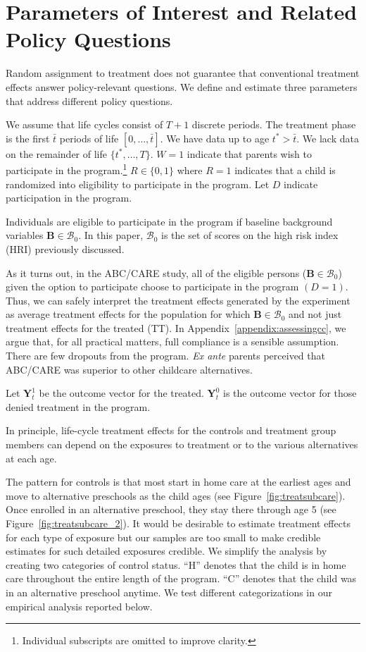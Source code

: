 \section{Parameters of Interest and Related Policy Questions} \label{section:methodsquestions}

Random assignment to treatment does not guarantee that conventional treatment effects answer policy-relevant questions. We define and estimate three parameters that address different policy questions.

We assume that life cycles consist of $T+1$ discrete periods. The treatment phase is the first $\bar{t}$ periods of life $\left[0,\dots,\bar{t}\right]$. We have data up to age $t^{*}>\bar{t}$. We lack data on the remainder of life $\{t^*,\dots,T\}$. $W=1$ indicate that parents wish to participate in the program.\footnote{Individual subscripts are omitted to improve clarity.} $R \in \{0,1\}$ where $R=1$ indicates that a child is randomized into eligibility to participate in the program. Let $D$ indicate participation in the program.

Individuals are eligible to participate in the program if baseline background variables $\bm{B}\in\mathcal{B}_0$. In this paper, $\mathcal{B}_0$ is the set of scores on the high risk index (HRI) previously discussed. 

As it turns out, in the ABC/CARE study, all of the eligible persons ($\bm{B}\in\mathcal{B}_0$) given the option to participate choose to participate in the program $(D=1)$. Thus, we can safely interpret the treatment effects generated by the experiment as average treatment effects for the population for which $\bm{B}\in\mathcal{B}_0$ and not just treatment effects for the treated (TT). In Appendix~\ref{appendix:assessingcc}, we argue that, for all practical matters, full compliance is a sensible assumption. There are few dropouts from the program. \emph{Ex ante} parents perceived that ABC/CARE was superior to other childcare alternatives.

Let $\bm{Y}^1_t$ be the outcome vector for the treated. $\bm{Y}^0_t$ is the outcome vector for those denied treatment in the program.

In principle, life-cycle treatment effects for the controls and treatment group members can depend on the exposures to treatment or to the various alternatives at each age. 

The pattern for controls is that most start in home care at the earliest ages and move to alternative preschools as the child ages (see Figure~\ref{fig:treatsubcare}). Once enrolled in an alternative preschool, they stay there through age 5 (see Figure~\ref{fig:treatsubcare_2}). It would be desirable to estimate treatment effects for each type of exposure but our samples are too small to make credible estimates for such detailed exposures credible. We simplify the analysis by creating two categories of control status. ``H'' denotes that the child is in home care throughout the entire length of the program. ``C'' denotes that the child was in an alternative preschool anytime. We test different categorizations in our empirical analysis reported below.

